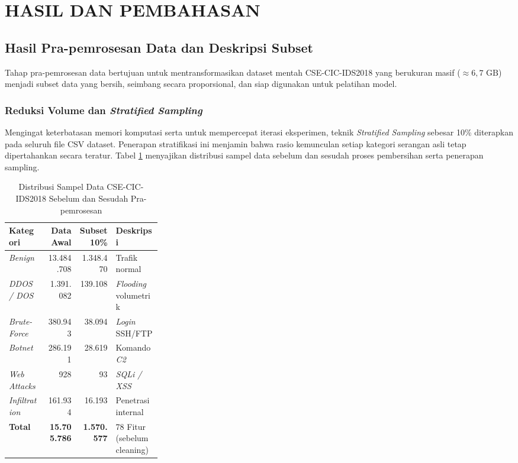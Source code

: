 \documentclass[11pt, a4paper]{article}
\begin{document}
\section{HASIL DAN PEMBAHASAN}


\subsection{Hasil Pra-pemrosesan Data dan Deskripsi Subset}
Tahap pra-pemrosesan data bertujuan untuk mentransformasikan dataset mentah CSE-CIC-IDS2018 yang berukuran masif ($\approx 6{,}7\text{ GB}$) menjadi subset data yang bersih, seimbang secara proporsional, dan siap digunakan untuk pelatihan model.

\subsubsection{Reduksi Volume dan \textit{Stratified Sampling}}
Mengingat keterbatasan memori komputasi serta untuk mempercepat iterasi eksperimen, teknik \textit{Stratified Sampling} sebesar 10\% diterapkan pada seluruh file CSV dataset. Penerapan stratifikasi ini menjamin bahwa rasio kemunculan setiap kategori serangan asli tetap dipertahankan secara teratur. Tabel \ref{tab:distribusi_dataset} menyajikan distribusi sampel data sebelum dan sesudah proses pembersihan serta penerapan sampling.

\begin{table}[htbp]
\caption{Distribusi Sampel Data CSE-CIC-IDS2018 Sebelum dan Sesudah Pra-pemrosesan}
\label{tab:distribusi_dataset}
\centering
\vspace{0.2cm}
\scriptsize
\begin{tabular}{@{} l r r p{0.30\linewidth} @{}}
\toprule
\textbf{Kategori} & \textbf{Data Awal} & \textbf{Subset 10\%} & \textbf{Deskripsi} \\ \midrule
\textit{Benign} & 13.484.708 & 1.348.470 & Trafik normal \\ \addlinespace
\textit{DDOS / DOS} & 1.391.082 & 139.108 & \textit{Flooding} volumetrik \\ \addlinespace
\textit{Brute-Force} & 380.943 & 38.094 & \textit{Login} SSH/FTP \\ \addlinespace
\textit{Botnet} & 286.191 & 28.619 & Komando \textit{C2} \\ \addlinespace
\textit{Web Attacks} & 928 & 93 & \textit{SQLi / XSS} \\ \addlinespace
\textit{Infiltration} & 161.934 & 16.193 & Penetrasi internal \\ \midrule
\textbf{Total} & \textbf{15.705.786} & \textbf{1.570.577} & 78 Fitur (sebelum cleaning) \\ \bottomrule
\end{tabular}
\end{table}
\end{document}
